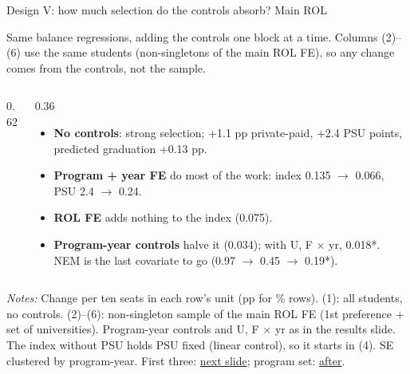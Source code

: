 \documentclass{beamer}
\begin{document}
\begin{frame}[label=d5-balance-noctrl]{Design V: how much selection do the controls absorb? Main ROL}
\vspace{-0.2cm}
{\scriptsize Same balance regressions, adding the controls one block at a time. Columns (2)--(6) use the same students (non-singletons of the main ROL FE), so any change comes from the controls, not the sample.\par}
\vspace{0.05cm}
\begin{columns}[T,onlytextwidth]
\begin{column}{0.62\textwidth}
\centering
\resizebox{\linewidth}{!}{}
\end{column}
\begin{column}{0.36\textwidth}
\scriptsize
\begin{itemize}
    \setlength{\itemsep}{2pt}
    \item \textbf{No controls}: strong selection; +1.1 pp private-paid, +2.4 PSU points, predicted graduation +0.13 pp.
    \item \textbf{Program + year FE} do most of the work: index 0.135 $\to$ 0.066, PSU 2.4 $\to$ 0.24.
    \item \textbf{ROL FE} adds nothing to the index (0.075).
    \item \textbf{Program-year controls} halve it (0.034); with U, F $\times$ yr, 0.018*. NEM is the last covariate to go (0.97 $\to$ 0.45 $\to$ 0.19*).
\end{itemize}
\end{column}
\end{columns}

\vspace{0.05cm}
\parbox{0.97\textwidth}{\tiny \textit{Notes:} Change per ten seats in each row's unit (pp for \% rows). (1): all students, no controls. (2)--(6): non-singleton sample of the main ROL FE (1st preference + set of universities). Program-year controls and U, F $\times$ yr as in the results slide. The index without PSU holds PSU fixed (linear control), so it starts in (4). SE clustered by program-year. First three: \hyperlink{d5-balance-noctrl-top3}{\color{blue}next slide}; program set: \hyperlink{d5-balance-noctrl-set}{\color{blue}after}.}
\end{frame}
\end{document}
